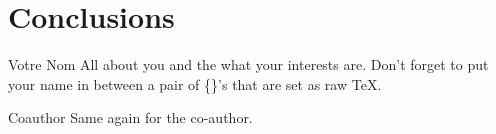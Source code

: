 \documentclass[twocolumn,a4paper]{IEEEtranfr}
\begin{document}
\clubsuit
 

\section{Conclusions}

%
%

%


{}
\begin{biography}
{Votre Nom} All about you and the what your interests are. Don't
forget to put your name in between a pair of \{\}'s that are set as
raw \TeX{}.
\end{biography}

\begin{biography}
{Coauthor} Same again for the co-author.
\end{biography}
\end{document}
